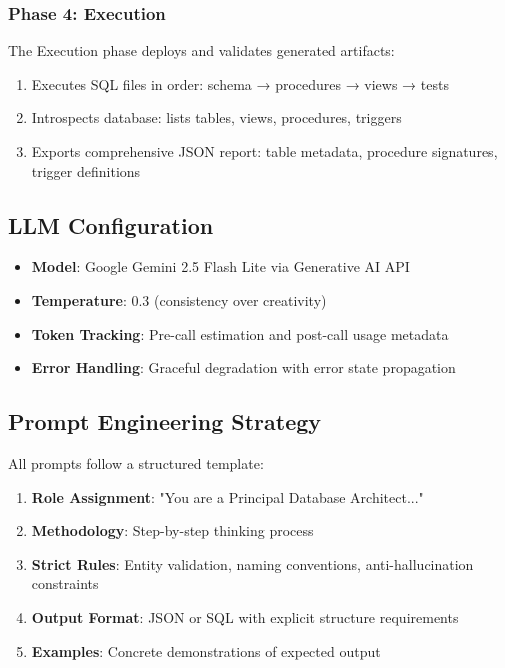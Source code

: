 \documentclass[12pt,a4paper]{article}
\begin{document}
\subsubsection{Phase 4: Execution}

The Execution phase deploys and validates generated artifacts:

\begin{enumerate}
\item Executes SQL files in order: schema → procedures → views → tests
\item Introspects database: lists tables, views, procedures, triggers
\item Exports comprehensive JSON report: table metadata, procedure signatures, trigger definitions
\end{enumerate}

\subsection{LLM Configuration}

\begin{itemize}
\item \textbf{Model}: Google Gemini 2.5 Flash Lite via Generative AI API
\item \textbf{Temperature}: 0.3 (consistency over creativity)
\item \textbf{Token Tracking}: Pre-call estimation and post-call usage metadata
\item \textbf{Error Handling}: Graceful degradation with error state propagation
\end{itemize}

\subsection{Prompt Engineering Strategy}

All prompts follow a structured template:

\begin{enumerate}
\item \textbf{Role Assignment}: "You are a Principal Database Architect..."
\item \textbf{Methodology}: Step-by-step thinking process
\item \textbf{Strict Rules}: Entity validation, naming conventions, anti-hallucination constraints
\item \textbf{Output Format}: JSON or SQL with explicit structure requirements
\item \textbf{Examples}: Concrete demonstrations of expected output
\end{enumerate}
\end{document}
